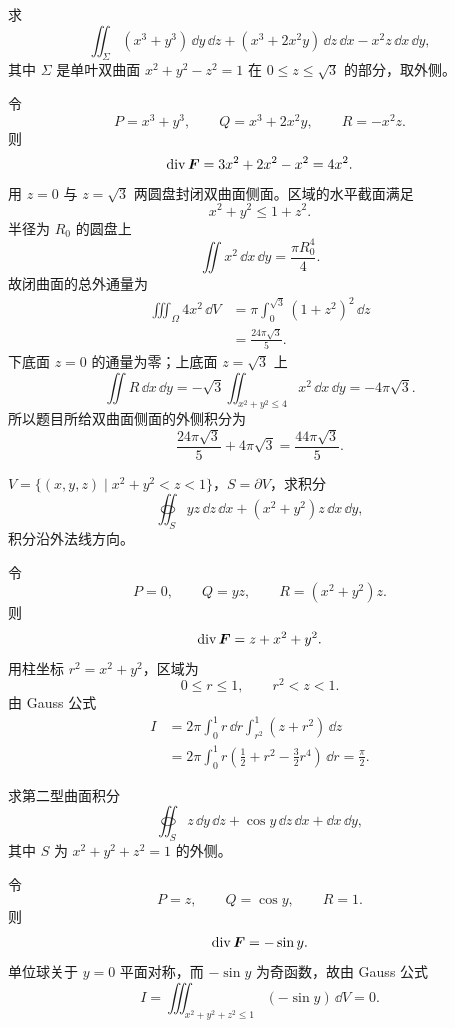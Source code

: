 \begin{xexercise}[5]
求
\[
  \iint_\Sigma(x^3+y^3)\,\dd y\,\dd z+(x^3+2x^2y)\,\dd z\,\dd x-x^2z\,\dd x\,\dd y,
\]
其中 $\Sigma$ 是单叶双曲面 $x^2+y^2-z^2=1$ 在 $0\le z\le\sqrt3$ 的部分，取外侧。
\end{xexercise}
\begin{xsolution}
令
\[
P=x^3+y^3,\qquad Q=x^3+2x^2y,\qquad R=-x^2z.
\]
则
\[
  \operatorname{div}\bm{F}=3x^2+2x^2-x^2=4x^2.
\]
用 $z=0$ 与 $z=\sqrt3$ 两圆盘封闭双曲面侧面。区域的水平截面满足
\[
  x^2+y^2\le1+z^2.
\]
半径为 $R_0$ 的圆盘上
\[
  \iint x^2\,\dd x\,\dd y=\frac{\pi R_0^4}{4}.
\]
故闭曲面的总外通量为
\begin{align*}
\iiint_\Omega4x^2\,\dd V
&=\pi\int_0^{\sqrt3}(1+z^2)^2\,\dd z\\
&=\frac{24\pi\sqrt3}{5}.
\end{align*}
下底面 $z=0$ 的通量为零；上底面 $z=\sqrt3$ 上
\[
  \iint R\,\dd x\,\dd y
  =-\sqrt3\iint_{x^2+y^2\le4}x^2\,\dd x\,\dd y
  =-4\pi\sqrt3.
\]
所以题目所给双曲面侧面的外侧积分为
\[
  \boxed{\frac{24\pi\sqrt3}{5}+4\pi\sqrt3
  =\frac{44\pi\sqrt3}{5}}.
\]
\end{xsolution}


\begin{xexercise}[6]
$V=\{(x,y,z)\mid x^2+y^2<z<1\}$，$S=\partial V$，求积分
\[
  \oiint_S yz\,\dd z\,\dd x+(x^2+y^2)z\,\dd x\,\dd y,
\]
积分沿外法线方向。
\end{xexercise}
\begin{xsolution}
令
\[
  P=0,\qquad Q=yz,\qquad R=(x^2+y^2)z.
\]
则
\[
  \operatorname{div}\bm{F}=z+x^2+y^2.
\]
用柱坐标 $r^2=x^2+y^2$，区域为
\[
  0\le r\le1,\qquad r^2<z<1.
\]
由 Gauss 公式
\begin{align*}
I
&=2\pi\int_0^1r\,\dd r\int_{r^2}^{1}(z+r^2)\,\dd z\\
&=2\pi\int_0^1r\left(\frac12+r^2-\frac32r^4\right)\,\dd r
=\frac\pi2.
\end{align*}
\end{xsolution}


\begin{xexercise}[7]
求第二型曲面积分
\[
  \oiint_S z\,\dd y\,\dd z+\cos y\,\dd z\,\dd x+\dd x\,\dd y,
\]
其中 $S$ 为 $x^2+y^2+z^2=1$ 的外侧。
\end{xexercise}
\begin{xsolution}
令
\[
  P=z,\qquad Q=\cos y,\qquad R=1.
\]
则
\[
  \operatorname{div}\bm{F}=-\sin y.
\]
单位球关于 $y=0$ 平面对称，而 $-\sin y$ 为奇函数，故由 Gauss 公式
\[
  \boxed{I=\iiint_{x^2+y^2+z^2\le1}(-\sin y)\,\dd V=0}.
\]
\end{xsolution}


